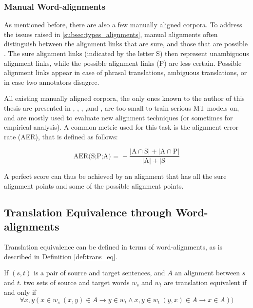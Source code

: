 \documentclass{report}
\begin{document}
\subsubsection{Manual Word-alignments}\label{subsubsec:man_alignments}

As mentioned before, there are also a few manually aligned corpora. To address the issues raised in \ref{subsec:types_alignments}, manual alignments often distinguish between the alignment links that are sure, and those that are possible \citep{lambert2005guidelines}. The sure alignment links (indicated by the letter S) then represent unambiguous alignment links, while the possible alignment links (P) are less certain. Possible alignment links appear in case of phrasal translations, ambiguous translations, or in case two annotators disagree. 

All existing manually aligned corpora, the only ones known to the author of this thesis are presented in \cite{och2000improved}, \cite{graca2008building}, \cite{mihalcea2003evaluation}, \cite{pado2006optimal},and \cite{ahrenberg2000evaluation}, are too small to train serious MT models on, and are mostly used to evaluate new alignment techniques (or sometimes for empirical analysis). A common metric used for this task is the alignment error rate (AER), that is defined as follows:

$$
\text{AER(S;P;A) = } - \frac{|\text{A}\cap\text{S}| + |\text{A}\cap\text{P}|}{|\text{A}| + |\text{S}|}
$$

A perfect score can thus be achieved by an alignment that has all the sure alignment points and some of the possible alignment points.



\subsection{Translation Equivalence through Word-alignments}

Translation equivalence can be defined in terms of word-alignments, as is described in Definition \ref{def:trans_eq}.

\begin{definition}\label{def:trans_eq}
If $(s,t)$ is a pair of source and target sentences, and $A$ an alignment between $s$ and $t$. two sets of source and target words $w_s$ and $w_t$ are translation equivalent if and only if $$\forall x,y ( x\in w_s~(x,y)\in A \rightarrow y\in w_t \land x,y \in w_t~(y,x)\in A \rightarrow x\in A))$$
\end{definition}
\end{document}
